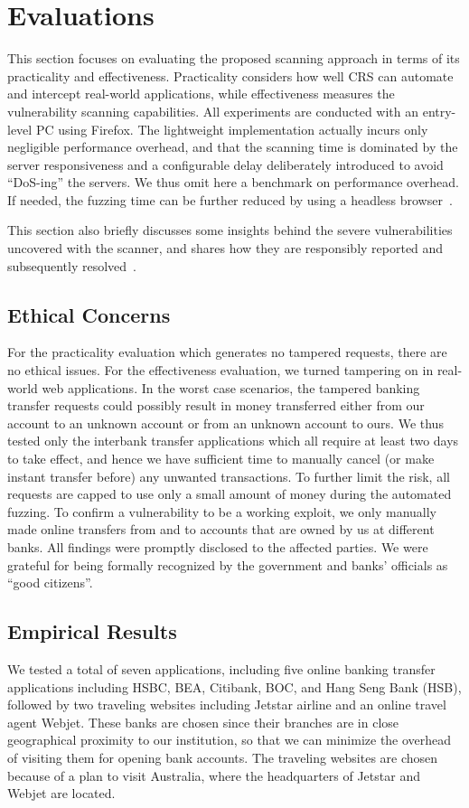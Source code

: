 \documentclass[letter]{sig-alternate-2013}
\begin{document}
 \section{Evaluations}
\label{sec:crs_evaluation}

This section focuses on evaluating the proposed scanning approach in terms of its practicality and effectiveness. Practicality considers how well CRS can automate and intercept real-world applications, while effectiveness measures the vulnerability scanning capabilities. All experiments are conducted with an entry-level PC using Firefox. The lightweight implementation actually incurs only negligible performance overhead, and that the scanning time is dominated by the server responsiveness and a configurable delay deliberately introduced to avoid ``DoS-ing'' the servers. We thus omit here a benchmark on performance overhead. If needed, the fuzzing time can be further reduced by using a headless browser~\cite{phantomjs}.

This section also briefly discusses some insights behind the severe vulnerabilities uncovered with the scanner, and shares how they are responsibly reported and subsequently resolved~\cite{shop-for-free}.

\subsection{Ethical Concerns}
For the practicality evaluation which generates no tampered requests, there are no ethical issues. For the effectiveness evaluation, we turned tampering on in real-world web applications. In the worst case scenarios, the tampered banking transfer requests could possibly result in money transferred either from our account to an unknown account or from an unknown account to ours. We thus tested only the interbank transfer applications which all require at least two days to take effect, and hence we have sufficient time to manually cancel (or make instant transfer before) any unwanted transactions. To further limit the risk, all requests are capped to use only a small amount of money during the automated fuzzing. To confirm a vulnerability to be a working exploit, we only manually made online transfers from and to accounts that are owned by us at different banks. All findings were promptly disclosed to the affected parties. We were grateful for being formally recognized by the government and banks' officials as ``good citizens''.

\subsection{Empirical Results}
We tested a total of seven applications, including five online banking transfer applications including HSBC, BEA, Citibank, BOC, and Hang Seng Bank (HSB), followed by two traveling websites including Jetstar airline and an online travel agent Webjet. These banks are chosen since their branches are in close geographical proximity to our institution, so that we can minimize the overhead of visiting them for opening bank accounts. The traveling websites are chosen because of a plan to visit Australia, where the headquarters of Jetstar and Webjet are located.
\end{document}
